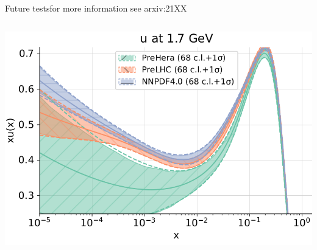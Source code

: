 \begin{frame}{Future tests}{for more information see arxiv:21XX}
\begin{columns}
        \includegraphics[width=1.0\textwidth]{juan_future_hyperopt/diffu}

    \end{columns}
\end{frame}


% 
